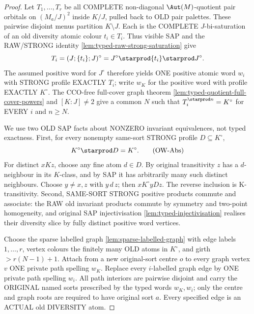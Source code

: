 \begin{proof}
Let $T_1,\ldots,T_r$ be all COMPLETE non-diagonal
$\Aut(M)$-quotient pair orbitals on $(M_a/J)^2$
inside $K/J$, pulled back to OLD pair palettes.
These pairwise disjoint menus partition
$K\setminus J$. Each is the COMPLETE
$J$-bi-saturation of an old diversity
atomic colour $t_i\in T_i$. Thus visible
SAP and the RAW/STRONG identity
\cref{lem:typed-raw-strong-saturation}
give
\[
 T_i=(J;\{t_i\};J)^\circ
       =J^\circ\starprod\{t_i\}
                       \starprod J^\circ .
\]
The assumed positive word for $J^\circ$
therefore yields ONE positive atomic
word $w_i$ with STRONG profile EXACTLY $T_i$;
write $w_K$ for the positive word with
profile EXACTLY $K^\circ$.
The CCO-free full-cover graph theorem
\cref{lem:typed-quotient-full-cover-powers}
and $[K:J]\ne2$ give a common $N$
such that $T_i^{\starprod n}=K^\circ$
for EVERY $i$ and $n\ge N$.

We use two OLD SAP facts about NONZERO
invariant equivalences, not typed exactness.
First, for every nonempty same-sort STRONG
profile $D\subseteq K^\circ$,
\[
                 K^\circ\starprod D=K^\circ.
\tag{OW-Abs}\label{eq:typed-old-reset-absorption}
\]
For distinct $xKz$, choose any fine atom
$d\in D$. By original transitivity $z$
has a $d$-neighbour in its $K$-class,
and by SAP it has arbitrarily many such
distinct neighbours. Choose $y\ne x,z$
with $y\,d\,z$; then $xK^\circ yDz$.
The reverse inclusion is K-transitivity.
Second, SAME-SORT STRONG positive
products commute and associate:
the RAW old invariant products commute
by symmetry and two-point homogeneity,
and original SAP injectivisation
\cref{lem:typed-injectivisation}
realises their diversity slice by fully
distinct positive word vertices.

Choose the sparse labelled graph
\cref{lem:sparse-labelled-graph} with
edge labels $1,\ldots,r$, vertex colours
the finitely many OLD atoms in $K^\circ$,
and girth $>r(N-1)+1$.
Attach from a new original-sort centre
$o$ to every graph vertex $v$ ONE private
path spelling $w_K$. Replace every
$i$-labelled graph edge by ONE private
path spelling $w_i$. All path interiors
are pairwise disjoint and carry the ORIGINAL
named sorts prescribed by the typed words
$w_K,w_i$; only the centre and graph roots
are required to have original sort $a$.
Every specified edge is an ACTUAL old
DIVERSITY atom.


\end{proof}
